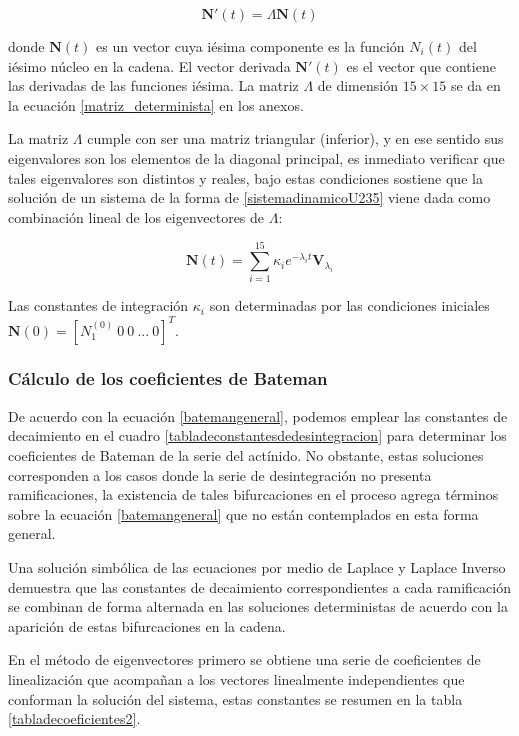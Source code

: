 \begin{equation}
	\mathbf{N'}(t)=\Lambda \mathbf{N}(t)\label{sistemadinamicoU235}
\end{equation}


\noindent donde $\mathbf{N}(t)$ es un vector cuya iésima componente es la función $N_i(t)$ del iésimo núcleo en la cadena. El vector derivada $\mathbf{N'}(t)$ es el vector que contiene las derivadas de las funciones iésima. La matriz $\Lambda$ de dimensión $15\times15$ se da en la ecuación \ref{matriz_determinista} en los anexos.

La matriz $\Lambda$ cumple con ser una matriz triangular (inferior), y en ese sentido sus eigenvalores son los elementos de la diagonal principal, es inmediato verificar que tales eigenvalores son distintos y reales, bajo estas condiciones \cite{Hirsch.2004} sostiene que la solución de un sistema de la forma de \ref{sistemadinamicoU235} viene dada como combinación lineal de los eigenvectores de $\Lambda$:

$$\mathbf{N}(t)=\sum_{i=1}^{15}\kappa_i e^{-\lambda_i t} \mathbf{V}_{\lambda_i}$$

\noindent Las constantes de integración $\kappa_i$ son determinadas por las condiciones iniciales $\mathbf{N}(0)=\left[N_1^{(0)}\ 0\ 0\ ...\ 0\right]^T$.

\subsubsection{Cálculo de los coeficientes de Bateman}

De acuerdo con la ecuación \ref{batemangeneral}, podemos emplear las constantes de decaimiento en el cuadro \ref{tabladeconstantesdedesintegracion} para determinar los coeficientes de Bateman de la serie del actínido. No obstante, estas soluciones corresponden a los casos donde la serie de desintegración no presenta ramificaciones, la existencia de tales bifurcaciones en el proceso agrega términos sobre la ecuación \ref{batemangeneral} que no están contemplados en esta forma general.

Una solución simbólica de las ecuaciones por medio de Laplace y Laplace Inverso demuestra que las constantes de decaimiento correspondientes a cada ramificación se combinan de forma alternada en las soluciones deterministas de acuerdo con la aparición de estas bifurcaciones en la cadena.

En el método de eigenvectores primero se obtiene una serie de coeficientes de linealización que acompañan a los vectores linealmente independientes que conforman la solución del sistema, estas constantes se resumen en la tabla \ref{tabladecoeficientes2}. 

